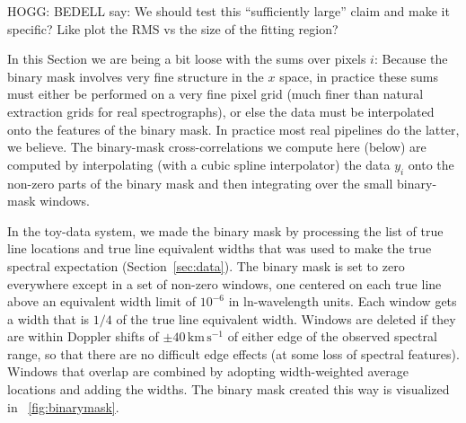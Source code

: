 \documentclass[modern]{aastex631}
\newcommand{\unit}[1]{\mathrm{#1}}
\newcommand{\km}{\unit{km}}
\newcommand{\s}{\unit{s}}
\newcommand{\kmps}{\km\,\s^{-1}}
\newcommand{\sectionname}{Section}
\newcommand{\secref}[1]{\sectionname~\ref{#1}}
\newcommand{\figref}[1]{\figurename~\ref{#1}}
\begin{document}
HOGG: BEDELL say: We should test this ``sufficiently large'' claim and make it specific? Like plot the RMS vs the size of the fitting region?

In this \sectionname{} we are being a bit loose with the sums over pixels $i$:
Because the binary mask involves very fine structure in the $x$ space, in practice these sums must either be performed on a very fine pixel grid (much finer than natural extraction grids for real spectrographs), or else the data must be interpolated onto the features of the binary mask.
In practice most real pipelines do the latter, we believe.
The binary-mask cross-correlations we compute here (below) are computed by interpolating (with a cubic spline interpolator) the data $y_i$ onto the non-zero parts of the binary mask and then integrating over the small binary-mask windows.

In the toy-data system, we made the binary mask by processing the list of true line locations and true line equivalent widths that was used to make the true spectral expectation (\secref{sec:data}).
The binary mask is set to zero everywhere except in a set of non-zero windows, one centered on each true line above an equivalent width limit of $10^{-6}$ in ln-wavelength units.
Each window gets a width that is $1/4$ of the true line equivalent width.
Windows are deleted if they are within Doppler shifts of $\pm 40\,\kmps$ of either edge of the observed spectral range, so that there are no difficult edge effects (at some loss of spectral features).
Windows that overlap are combined by adopting width-weighted average locations and adding the widths.
The binary mask created this way is visualized in \figref{fig:binarymask}.
\end{document}
